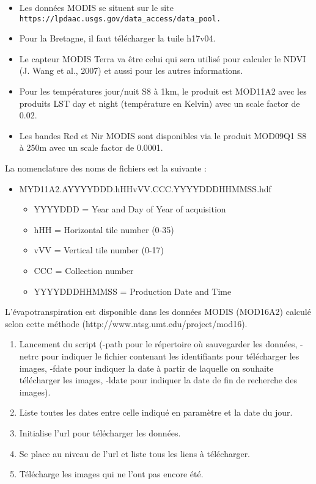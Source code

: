 \documentclass[10pt,a4paper]{article}
\begin{document}
\begin{itemize}
\item Les données MODIS se situent sur le site \verb!https://lpdaac.usgs.gov/data_access/data_pool.!
\item Pour la Bretagne, il faut télécharger la tuile h17v04. 
\item Le capteur MODIS Terra va être celui qui sera utilisé pour calculer le NDVI (J. Wang et al., 2007) et aussi pour les autres informations.
\item Pour les températures jour/nuit S8 à 1km, le produit est MOD11A2 avec les produits LST day et night (température en Kelvin) avec un scale factor de 0.02.
\item Les bandes Red et Nir MODIS sont disponibles via le produit MOD09Q1 S8 à 250m avec un scale factor de 0.0001.
\end{itemize}  

La nomenclature des noms de fichiers est la suivante :
\begin{itemize}
\item MYD11A2.AYYYYDDD.hHHvVV.CCC.YYYYDDDHHMMSS.hdf
\begin{itemize}
\item YYYYDDD = Year and Day of Year of acquisition
\item hHH = Horizontal tile number (0-35)
\item vVV = Vertical tile number (0-17)
\item CCC = Collection number
\item YYYYDDDHHMMSS = Production Date and Time
\end{itemize}
\end{itemize}

L'évapotranspiration est disponible dans les données MODIS (MOD16A2) calculé selon cette méthode (http://www.ntsg.umt.edu/project/mod16).

\begin{enumerate}
\item Lancement du script (-path pour le répertoire où sauvegarder les données, -netrc pour indiquer le fichier contenant les identifiants pour télécharger les images, -fdate pour indiquer la date à partir de laquelle on souhaite télécharger les images, -ldate pour indiquer la date de fin de recherche des images).
\item Liste toutes les dates entre celle indiqué en paramètre et la date du jour.
\item Initialise l'url pour télécharger les données.
\item Se place au niveau de l'url et liste tous les liens à télécharger.
\item Télécharge les images qui ne l'ont pas encore été.
\end{enumerate}
\end{document}
